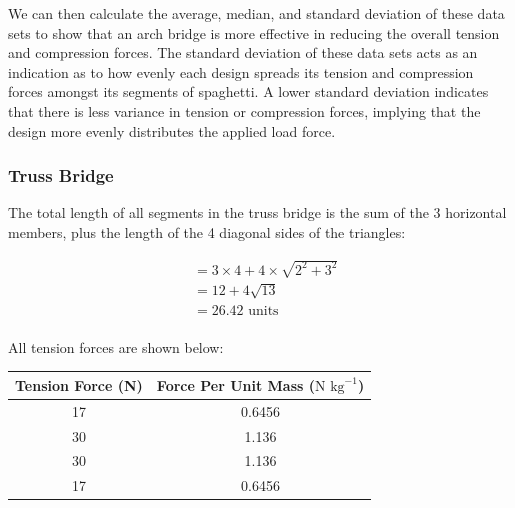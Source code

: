 \documentclass[a4paper,11pt]{article}
\begin{document}
We can then calculate the average, median, and standard deviation of these data
sets to show that an arch bridge is more effective in reducing the overall
tension and compression forces.
The standard deviation of these data sets acts as an indication as to how evenly
each design spreads its tension and compression forces amongst its segments of
spaghetti.
A lower standard deviation indicates that there is less variance in tension or
compression forces, implying that the design more evenly distributes the applied
load force.



\subsubsection{Truss Bridge}

The total length of all segments in the truss bridge is the sum of the 3
horizontal members, plus the length of the 4 diagonal sides of the triangles:

$$
\begin{aligned}
& = 3 \times 4 + 4 \times \sqrt{2^2 + 3^2} \\
& = 12 + 4\sqrt{13} \\
& = 26.42\mbox{ units} \\
\end{aligned}
$$

All tension forces are shown below:

\begin{center}
\begin{tabular}{|c|c|}
\hline
Tension Force (N) & Force Per Unit Mass ($\mbox{N kg}^{-1}$) \\
\hline
17 & 0.6456 \\
30 & 1.136 \\
30 & 1.136 \\
17 & 0.6456 \\
\hline
\end{tabular}
\end{center}
\end{document}
